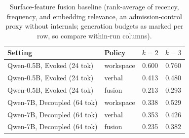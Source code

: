 \begin{table}[h]
\centering
\caption{Surface-feature fusion baseline (rank-average of recency, frequency, and
embedding relevance, an admission-control proxy without internals;
generation budgets as marked per row, so compare within-run columns).}
\label{tab:appA12}
\small
\begin{tabular}{llcc}
\toprule
Setting & Policy & $k{=}2$ & $k{=}3$ \\
\midrule
Qwen-0.5B, Evoked (24 tok) & workspace & 0.600 & 0.760 \\
Qwen-0.5B, Evoked (24 tok) & verbal & 0.413 & 0.480 \\
Qwen-0.5B, Evoked (24 tok) & fusion & 0.213 & 0.293 \\
Qwen-7B, Decoupled (64 tok) & workspace & 0.338 & 0.529 \\
Qwen-7B, Decoupled (64 tok) & verbal & 0.353 & 0.426 \\
Qwen-7B, Decoupled (64 tok) & fusion & 0.235 & 0.382 \\
\bottomrule
\end{tabular}
\end{table}
